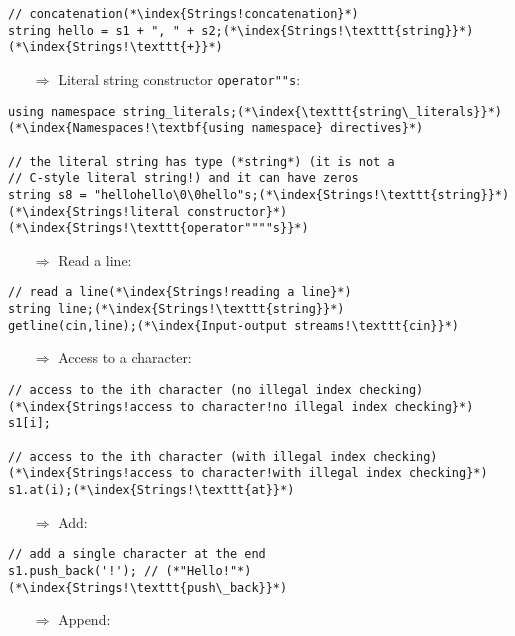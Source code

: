 \documentclass[10pt]{article}
\begin{document}
\begin{lstlisting}
// concatenation(*\index{Strings!concatenation}*)
string hello = s1 + ", " + s2;(*\index{Strings!\texttt{string}}*)(*\index{Strings!\texttt{+}}*)
\end{lstlisting}
\begin{enumerate}
\item[$\Rightarrow$] Literal string constructor \texttt{operator""s}:
\end{enumerate}
\begin{lstlisting}
using namespace string_literals;(*\index{\texttt{string\_literals}}*)(*\index{Namespaces!\textbf{using namespace} directives}*)

// the literal string has type (*string*) (it is not a 
// C-style literal string!) and it can have zeros
string s8 = "hellohello\0\0hello"s;(*\index{Strings!\texttt{string}}*)(*\index{Strings!literal constructor}*)(*\index{Strings!\texttt{operator""""s}}*)
\end{lstlisting}
\begin{enumerate}
\item[$\Rightarrow$] Read a line:
\end{enumerate}
\begin{lstlisting}
// read a line(*\index{Strings!reading a line}*)
string line;(*\index{Strings!\texttt{string}}*)
getline(cin,line);(*\index{Input-output streams!\texttt{cin}}*)
\end{lstlisting}
\begin{enumerate}
\item[$\Rightarrow$] Access to a character:
\end{enumerate}
\begin{lstlisting}
// access to the ith character (no illegal index checking)(*\index{Strings!access to character!no illegal index checking}*)
s1[i];

// access to the ith character (with illegal index checking)(*\index{Strings!access to character!with illegal index checking}*)
s1.at(i);(*\index{Strings!\texttt{at}}*)
\end{lstlisting}
\begin{enumerate}
\item[$\Rightarrow$] Add:
\end{enumerate}
\begin{lstlisting}
// add a single character at the end
s1.push_back('!'); // (*"Hello!"*)(*\index{Strings!\texttt{push\_back}}*)
\end{lstlisting}
\begin{enumerate}
\item[$\Rightarrow$] Append:
\end{enumerate}
\end{document}
